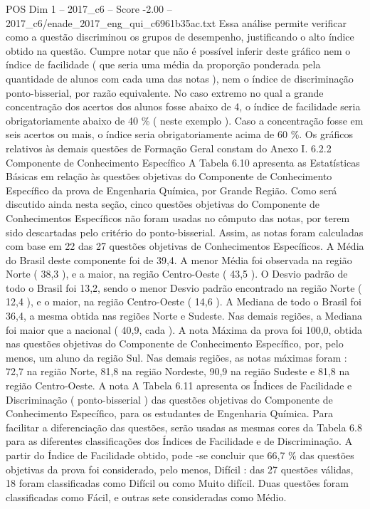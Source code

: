 \begin{textsample}{POS Dim 1 – 2017\_c6 – Score -2.00 – 2017\_c6/enade\_2017\_eng\_qui\_c6961b35ac.txt}
Essa análise permite verificar como a questão discriminou os grupos de desempenho, justificando o alto índice obtido na questão.
Cumpre notar que não é possível inferir deste gráfico nem o índice de facilidade ( que seria uma média da proporção ponderada pela quantidade de alunos com cada uma das notas ), nem o índice de discriminação ponto-bisserial, por razão equivalente.
No caso extremo no qual a grande concentração dos acertos dos alunos fosse abaixo de 4, o índice de facilidade seria obrigatoriamente abaixo de 40 \% ( neste exemplo ).
Caso a concentração fosse em seis acertos ou mais, o índice seria obrigatoriamente acima de 60 \%.
Os gráficos relativos às demais questões de Formação Geral constam do Anexo I. 6.2.2 Componente de Conhecimento Específico A Tabela 6.10 apresenta as Estatísticas Básicas em relação às questões objetivas do Componente de Conhecimento Específico da prova de Engenharia Química, por Grande Região.
Como será discutido ainda nesta seção, cinco questões objetivas do Componente de Conhecimentos Específicos não foram usadas no cômputo das notas, por terem sido descartadas pelo critério do ponto-bisserial.
Assim, as notas foram calculadas com base em 22 das 27 questões objetivas de Conhecimentos Específicos.
A Média do Brasil deste componente foi de 39,4.
A menor Média foi observada na região Norte ( 38,3 ), e a maior, na região Centro-Oeste ( 43,5 ).
O Desvio padrão de todo o Brasil foi 13,2, sendo o menor Desvio padrão encontrado na região Norte ( 12,4 ), e o maior, na região Centro-Oeste ( 14,6 ).
A Mediana de todo o Brasil foi 36,4, a mesma obtida nas regiões Norte e Sudeste.
Nas demais regiões, a Mediana foi maior que a nacional ( 40,9, cada ).
A nota Máxima da prova foi 100,0, obtida nas questões objetivas do Componente de Conhecimento Específico, por, pelo menos, um aluno da região Sul.
Nas demais regiões, as notas máximas foram : 72,7 na região Norte, 81,8 na região Nordeste, 90,9 na região Sudeste e 81,8 na região Centro-Oeste.
A nota A Tabela 6.11 apresenta os Índices de Facilidade e Discriminação ( ponto-bisserial ) das questões objetivas do Componente de Conhecimento Específico, para os estudantes de Engenharia Química.
Para facilitar a diferenciação das questões, serão usadas as mesmas cores da Tabela 6.8 para as diferentes classificações dos Índices de Facilidade e de Discriminação.
A partir do Índice de Facilidade obtido, pode -se concluir que 66,7 \% das questões objetivas da prova foi considerado, pelo menos, Difícil : das 27 questões válidas, 18 foram classificadas como Difícil ou como Muito difícil.
Duas questões foram classificadas como Fácil, e outras sete consideradas como Médio.

\end{textsample}
